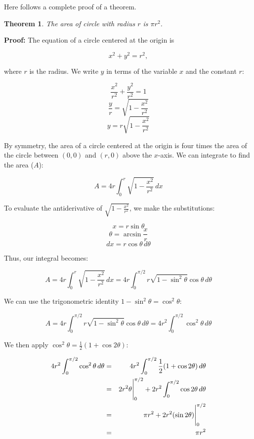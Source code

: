 Here follows a complete proof of a theorem.

\newtheorem{prf}{Theorem}

\begin{prf}
The area of circle with radius $r$ is $\pi r^2$.
\end{prf}

\noindent \textbf{Proof:} The equation of a circle centered at the
origin is

$$
x^2 + y^2 = r^2,
$$

\noindent where $r$ is the radius.  We  write $y$ in terms of the
variable $x$ and the constant $r$:

$$
\frac{x^2}{r^2} + \frac{y^2}{r^2} = 1
$$
$$
\frac{y}{r} = \sqrt{1-\frac{x^2}{r^2}}
$$
$$
y= r\sqrt {1-\frac{x^2}{r^2}}
$$

By symmetry, the area of a circle centered at the origin is four
times the area of the circle between $(0,0)$ and $(r, 0)$ above the
$x$-axis.  We can integrate to find the area ($A$):

$$
A = 4r\int_0^r \sqrt {1-\frac{x^2}{r^2}}\, dx
$$

To evaluate the antiderivative of $\displaystyle\sqrt
{1-\frac{x^2}{r^2}}$, we make the substitutions:

$$
x = r \sin \theta
$$
$$
\theta = \arcsin \frac{x}{r}
$$
$$
dx = r\cos \theta\, d\theta
$$

Thus, our integral becomes:

$$
A=4r\int_0^r \sqrt {1-\frac{x^2}{r^2}}\, dx = 4r\int_0^{\pi/2}
r\sqrt{1-\sin^2 \theta} \cos \theta\, d\theta
$$

 We can use the trigonometric identity $1 - \sin^2 \theta = \cos^2 \theta$:

$$
A=4r\int_0^{\pi/2} r\sqrt{1-\sin^2 \theta} \cos \theta\, d\theta=
4r^2\int_0^{\pi/2} \cos^2 \theta\, d\theta
$$

We then apply $\cos^2 \theta = \frac{1}{2}(1 + \cos 2\theta)$:

\begin{eqnarray*}
4r^2\int_0^{\pi/2} \cos^2 \theta\, d\theta &=& 4r^2\int_0^{\pi/2}  \frac{1}{2}(1 + \cos 2\theta) \,d\theta\\
& = & {2r^2\theta}\Bigg{|}_0^{\pi/2} + 2r^2\int_0^{\pi/2} \cos 2\theta \,d\theta\\
                                  & = & \pi r^2 + 2r^2(\sin2\theta)\Bigg{|}_0^{\pi/2}\\
                                  & = & \pi r^2
\end{eqnarray*}


